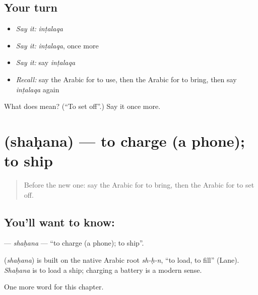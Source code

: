 \subsection*{Your turn}
\begin{itemize}
\raggedright
  \item \emph{Say it:} \emph{inṭalaqa}
  \item \emph{Say it:} \emph{inṭalaqa}, once more
  \item \emph{Say it:} say \emph{inṭalaqa}
  \item \emph{Recall:} say the Arabic for to use, then the Arabic for to bring, then say \emph{inṭalaqa} again
\end{itemize}

\begin{tcolorbox}[breakable,colback=teal!4,colframe=teal!35!black,title={Before you move on}]
What does  mean? (\textquotedblleft{}To set off\textquotedblright{}.) Say it once more.
\end{tcolorbox}
\section[\texorpdfstring{\ar{شحن} (shaḥana)}{شحن (shaḥana)}]{ (shaḥana) — to charge (a phone); to ship}

\label{lesson:AR-C226-shahana}



\begin{quote}
Before the new one: say the Arabic for to bring, then the Arabic for to set off.
\end{quote}

\subsection*{You'll want to know: }
\textbf{} — \emph{shaḥana} — \textquotedblleft{}to charge (a phone); to ship\textquotedblright{}.

\begin{cousinweb}
\textbf{} (\emph{shaḥana}) is built on the native Arabic root \emph{sh-ḥ-n}, \textquotedblleft{}to load, to fill\textquotedblright{} (Lane). \emph{Shaḥana} is to load a ship; charging a battery is a modern sense.
\end{cousinweb}

\begin{grammarlens}[title={What you've built}]
One more word for this chapter.
\end{grammarlens}

